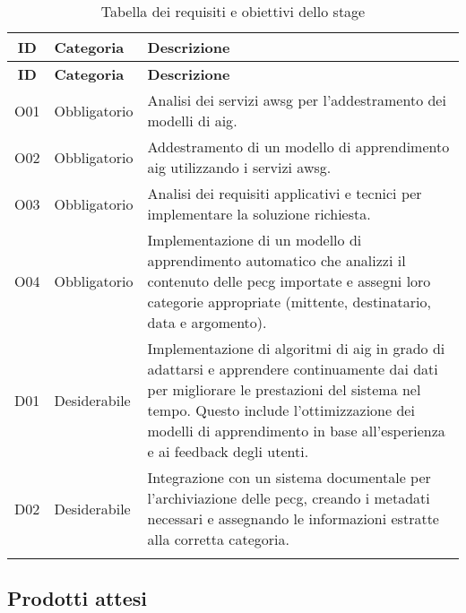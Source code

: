 \begin{longtable}{|c|p{4cm}|p{10cm}|}
    \hline
    \textbf{ID}  & \textbf{Categoria}                                               & \textbf{Descrizione}                                       \\
    \hline
    \endfirsthead

    \hline
    \textbf{ID}  & \textbf{Categoria}                                               & \textbf{Descrizione}                                       \\
    \hline
    \endhead

    O01          & Obbligatorio                                                     & Analisi dei servizi \gls{awsg} per l'addestramento dei modelli di \gls{aig}. \\
    \hline 
    O02          & Obbligatorio                                                     & Addestramento di un modello di apprendimento \gls{aig} utilizzando i servizi \gls{awsg}. \\
    \hline 
    O03          & Obbligatorio                                                     & Analisi dei requisiti applicativi e tecnici per implementare la soluzione richiesta. \\
    \hline 
    O04          & Obbligatorio                                                     & Implementazione di un modello di apprendimento automatico che analizzi il contenuto delle \gls{pecg} importate e assegni loro categorie appropriate (mittente, destinatario, data e argomento). \\
    \hline 
    D01          & Desiderabile                                                     & Implementazione di algoritmi di \gls{aig} in grado di adattarsi e apprendere continuamente dai dati per migliorare le prestazioni del sistema nel tempo. Questo include l'ottimizzazione dei modelli di apprendimento in base all'esperienza e ai feedback degli utenti. \\
    \hline 
    D02          & Desiderabile                                                     & Integrazione con un sistema documentale per l'archiviazione delle \gls{pecg}, creando i metadati necessari e assegnando le informazioni estratte alla corretta categoria. \\
    \hline
    \caption{Tabella dei requisiti e obiettivi dello stage} \\
\end{longtable}

\subsection{Prodotti attesi}


